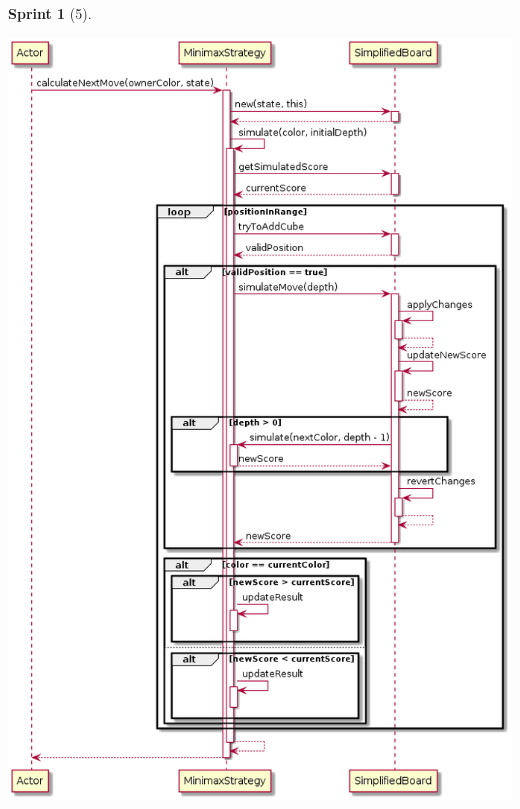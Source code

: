 \documentclass[12pt,a4paper,openright]{book}
\theoremstyle{break}
\newtheorem*{sprint}{Sprint}
\begin{document}
\begin{sprint}[5]
\begin{center}
\centering
\includegraphics[scale=0.5]{Minimax.calculateNextMove()-Sprint5.png}
\end{center}

\end{sprint}
\end{document}
